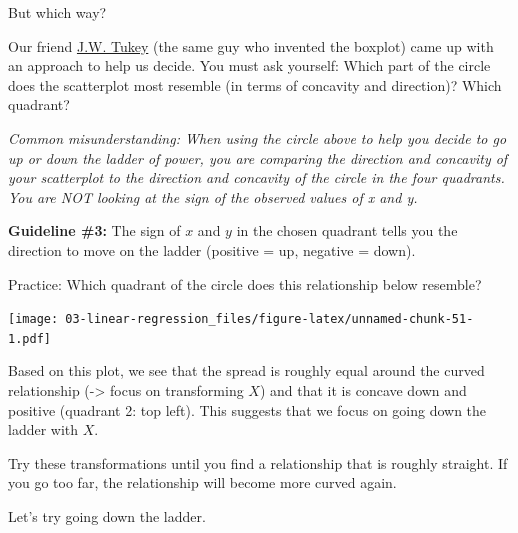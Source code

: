 \documentclass[
]{book}
\newenvironment{Shaded}{\begin{snugshade}}{\end{snugshade}}
\newcommand{\CommentTok}[1]{\textcolor[rgb]{0.56,0.35,0.01}{\textit{#1}}}
\newcommand{\DataTypeTok}[1]{\textcolor[rgb]{0.13,0.29,0.53}{#1}}
\newcommand{\DecValTok}[1]{\textcolor[rgb]{0.00,0.00,0.81}{#1}}
\newcommand{\KeywordTok}[1]{\textcolor[rgb]{0.13,0.29,0.53}{\textbf{#1}}}
\newcommand{\NormalTok}[1]{#1}
\newcommand{\OperatorTok}[1]{\textcolor[rgb]{0.81,0.36,0.00}{\textbf{#1}}}
\newcommand{\StringTok}[1]{\textcolor[rgb]{0.31,0.60,0.02}{#1}}
\begin{document}
But which way?

Our friend \href{https://en.wikipedia.org/wiki/John_Tukey}{J.W. Tukey} (the same guy who invented the boxplot) came up with an approach to help us decide. You must ask yourself: Which part of the circle does the scatterplot most resemble (in terms of concavity and direction)? Which quadrant?

\emph{Common misunderstanding: When using the circle above to help you decide to go up or down the ladder of power, you are comparing the direction and concavity of your scatterplot to the direction and concavity of the circle in the four quadrants. You are NOT looking at the sign of the observed values of x and y.}

\textbf{Guideline \#3:} The sign of \(x\) and \(y\) in the chosen quadrant tells you the direction to move on the ladder (positive = up, negative = down).

Practice: Which quadrant of the circle does this relationship below resemble?

\begin{Shaded}
\end{Shaded}

\texttt{[image: 03-linear-regression\_files/figure-latex/unnamed-chunk-51-1.pdf]}

Based on this plot, we see that the spread is roughly equal around the curved relationship (-\textgreater{} focus on transforming \(X\)) and that it is concave down and positive (quadrant 2: top left). This suggests that we focus on going down the ladder with \(X\).

Try these transformations until you find a relationship that is roughly straight. If you go too far, the relationship will become more curved again.

Let's try going down the ladder.

\begin{Shaded}
\end{Shaded}
\end{document}
